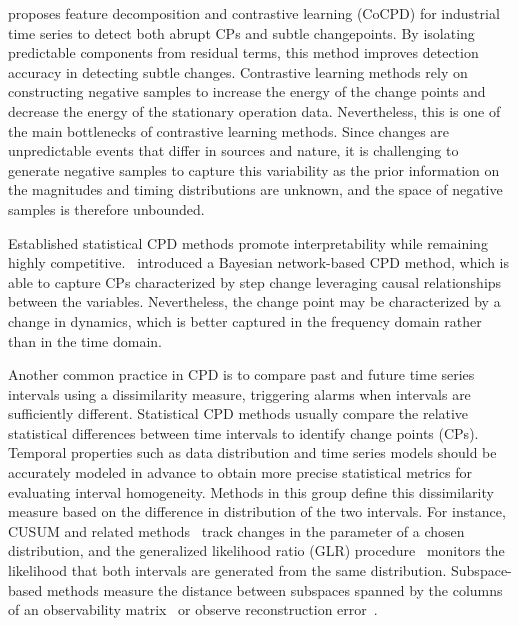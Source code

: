 \cite{Bao2024} proposes feature decomposition and contrastive learning (CoCPD) for industrial time series to detect both abrupt CPs and subtle changepoints. By isolating predictable components from residual terms, this method improves detection accuracy in detecting subtle changes. Contrastive learning methods rely on constructing negative samples to increase the energy of the change points and decrease the energy of the stationary operation data. Nevertheless, this is one of the main bottlenecks of contrastive learning methods. Since changes are unpredictable events that differ in sources and nature, it is challenging to generate negative samples to capture this variability as the prior information on the magnitudes and timing distributions are unknown, and the space of negative samples is therefore unbounded.

Established statistical CPD methods promote interpretability while remaining highly competitive.~\cite{Rajaganapathy2022} introduced a Bayesian network-based CPD method, which is able to capture CPs characterized by step change leveraging causal relationships between the variables. Nevertheless, the change point may be characterized by a change in dynamics, which is better captured in the frequency domain rather than in the time domain.

Another common practice in CPD is to compare past and future time series intervals using a dissimilarity measure, triggering alarms when intervals are sufficiently different. Statistical CPD methods usually compare the relative statistical differences between time intervals to identify change points (CPs). Temporal properties such as data distribution and time series models should be accurately modeled in advance to obtain more precise statistical metrics for evaluating interval homogeneity. Methods in this group define this dissimilarity measure based on the difference in distribution of the two intervals. For instance, CUSUM and related methods~\cite{Ye2023} track changes in the parameter of a chosen distribution, and the generalized likelihood ratio (GLR) procedure~\cite{Xie2013, Korycki2021} monitors the likelihood that both intervals are generated from the same distribution. Subspace-based methods measure the distance between subspaces spanned by the columns of an observability matrix~\cite{Moskvina2003, Kawahara2007} or observe reconstruction error~\cite{DeRyck2021, Bao2024}.

